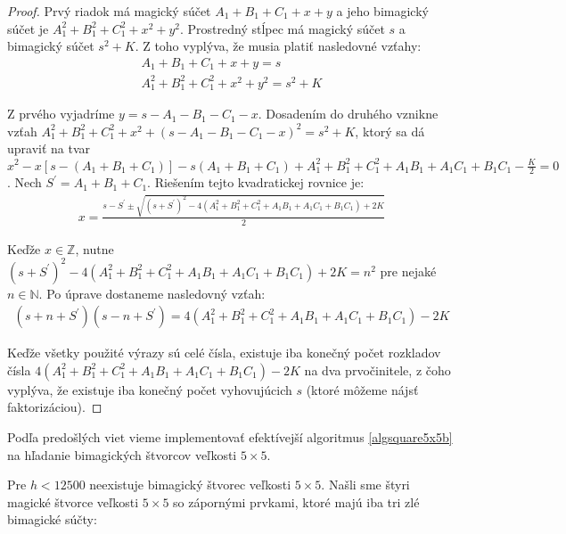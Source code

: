 \begin{proof} Prvý riadok má magický súčet $A_1 + B_1 + C_1 + x + y$ a jeho bimagický súčet je $A_1^2 + B_1^2 + C_1^2 + x^2 + y^2$. Prostredný stĺpec má magický súčet $s$ a bimagický súčet $s^2 + K$. Z toho vyplýva, že musia platiť nasledovné vzťahy:
\begin{gather*}
A_1 + B_1 + C_1 + x + y = s \\
A_1^2 + B_1^2 + C_1^2 + x^2 + y^2 = s^2 + K
\end{gather*}

Z prvého vyjadríme $y = s - A_1 - B_1 - C_1 - x$. Dosadením do druhého vznikne vzťah $A_1^2 + B_1^2 + C_1^2 + x^2 + (s - A_1 - B_1 - C_1 - x)^2 = s^2 + K$, ktorý sa dá upraviť na tvar $x^2 - x[s - (A_1 + B_1 + C_1)] - s(A_1 + B_1 + C_1) + A_1^2 + B_1^2 + C_1^2 + A_1 B_1 + A_1 C_1 + B_1 C_1 - \frac{K}{2} = 0$. Nech $S^\prime = A_1 + B_1 + C_1$. Riešením tejto kvadratickej rovnice je:
\begin{gather*}
x = \frac{s - S^\prime \pm \sqrt{(s + S^\prime)^2 - 4(A_1^2 + B_1^2 + C_1^2 + A_1 B_1 + A_1 C_1 + B_1 C_1) + 2K}}{2}
\end{gather*}

Keďže $x \in \mathbb{Z}$, nutne $(s + S^\prime)^2 - 4(A_1^2 + B_1^2 + C_1^2 + A_1 B_1 + A_1 C_1 + B_1 C_1) + 2K = n^2$ pre nejaké $n \in \mathbb{N}$. Po úprave dostaneme nasledovný vzťah:
\begin{gather*}
(s + n + S^\prime)(s - n + S^\prime) = 4(A_1^2 + B_1^2 + C_1^2 + A_1 B_1 + A_1 C_1 + B_1 C_1) - 2K
\end{gather*}

Keďže všetky použité výrazy sú celé čísla, existuje iba konečný počet rozkladov čísla $4(A_1^2 + B_1^2 + C_1^2 + A_1 B_1 + A_1 C_1 + B_1 C_1) - 2K$ na dva prvočinitele, z čoho vyplýva, že existuje iba konečný počet vyhovujúcich $s$ (ktoré môžeme nájsť faktorizáciou).
\end{proof}

Podľa predošlých viet vieme implementovať efektívejší algoritmus \ref{algsquare5x5b} na hľadanie bimagických štvorcov veľkosti $5 \times 5$. 

\begin{result} Pre $h < 12500$ neexistuje bimagický štvorec veľkosti $5 \times 5$. Našli sme štyri magické štvorce veľkosti $5 \times 5$ so zápornými prvkami, ktoré majú iba tri zlé bimagické súčty:
\end{result}


